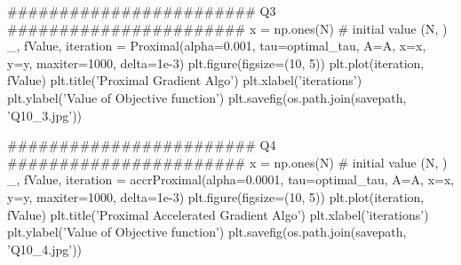 \documentclass[12pt, a4 paper]{article}
\begin{document}
\begin{framed}
\begin{python}
    ######################## Q3 #######################
    x = np.ones(N) # initial value (N, )
    _, fValue, iteration = Proximal(alpha=0.001, tau=optimal_tau, A=A, x=x, y=y, maxiter=1000, delta=1e-3)
    plt.figure(figsize=(10, 5))
    plt.plot(iteration, fValue)
    plt.title('Proximal Gradient Algo')
    plt.xlabel('iterations')
    plt.ylabel('Value of Objective function')
    plt.savefig(os.path.join(savepath, 'Q10_3.jpg'))

    ######################## Q4 #######################
    x = np.ones(N) # initial value (N, )
    _, fValue, iteration = accrProximal(alpha=0.0001, tau=optimal_tau, A=A, x=x, y=y, maxiter=1000, delta=1e-3)
    plt.figure(figsize=(10, 5))
    plt.plot(iteration, fValue)
    plt.title('Proximal Accelerated Gradient Algo')
    plt.xlabel('iterations')
    plt.ylabel('Value of Objective function')
    plt.savefig(os.path.join(savepath, 'Q10_4.jpg'))
        \end{python}
    \end{framed}
\end{document}

